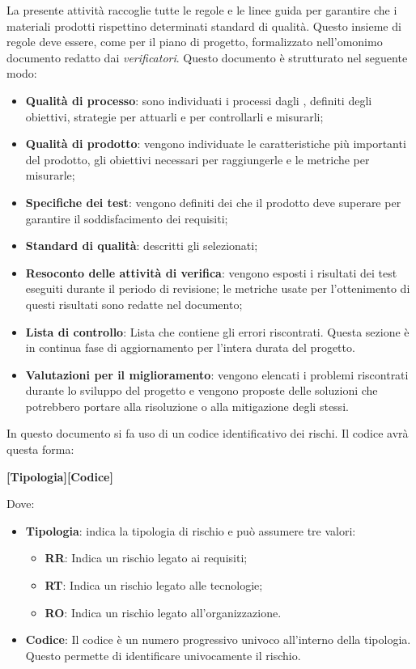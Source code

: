 La presente attività raccoglie tutte le regole e le linee guida per garantire che i materiali prodotti rispettino 
determinati standard di qualità. Questo insieme di regole deve essere, come per il piano di progetto, formalizzato 
nell'omonimo documento redatto dai \emph{verificatori}.
Questo documento è strutturato nel seguente modo:
\begin{itemize}
    \item \textbf{Qualità di processo}: sono individuati i processi dagli , definiti 
    degli obiettivi, strategie per attuarli e  per controllarli e misurarli;
    \item \textbf{Qualità di prodotto}: vengono individuate le caratteristiche più importanti del prodotto, gli 
    obiettivi necessari per raggiungerle e le metriche per misurarle;
    \item \textbf{Specifiche dei test}: vengono definiti dei  che il prodotto deve superare per 
    garantire il soddisfacimento dei requisiti;
    \item \textbf{Standard di qualità}: descritti gli  selezionati;
    \item \textbf{Resoconto delle attività di verifica}: vengono esposti i risultati dei test eseguiti durante il 
    periodo di revisione; le metriche usate per l'ottenimento di questi risultati sono redatte nel documento;
    \item \textbf{Lista di controllo}:  Lista che contiene gli errori riscontrati. Questa sezione è in continua fase di 
    aggiornamento per l'intera durata del progetto.
    \item \textbf{Valutazioni per il miglioramento}: vengono elencati i problemi riscontrati durante lo sviluppo del 
    progetto e vengono proposte delle soluzioni che potrebbero portare alla risoluzione o alla mitigazione degli stessi.
\end{itemize} 
In questo documento si fa uso di un codice identificativo dei rischi. Il codice avrà questa forma:
\begin{center}
	\textbf{[Tipologia][Codice]}
\end{center}
Dove:
\begin{itemize}

	\item \textbf{Tipologia}: indica la tipologia di rischio e può assumere tre valori:
	\begin{itemize}
		\item \textbf{RR}: Indica un rischio legato ai requisiti;
		\item \textbf{RT}: Indica un rischio legato alle tecnologie;
		\item \textbf{RO}: Indica un rischio legato all'organizzazione.
	\end{itemize}
    \item \textbf{Codice}: Il codice è un numero progressivo univoco all'interno della tipologia. Questo permette di 
    identificare univocamente il rischio.
\end{itemize}

